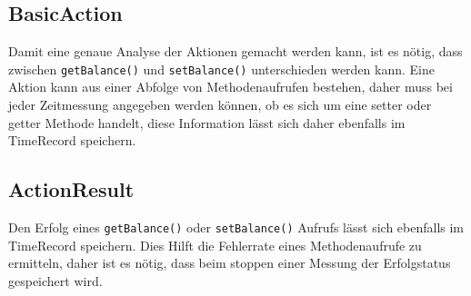 \subsection{BasicAction}
\label{sec:BasicAction}
Damit eine genaue Analyse der Aktionen ge\-macht werden kann, ist es nö\-tig, dass zwi\-schen \verb+getBalance()+ und \verb+setBalance()+ un\-ter\-schieden wer\-den kann. Eine Aktion kann aus einer Abfolge von Methoden\-auf\-rufen bestehen, daher muss bei jeder Zeitmessung angegeben werden können, ob es sich um eine setter oder getter Methode handelt, diese Information lässt sich daher ebenfalls im TimeRecord speichern.

\subsection{ActionResult}
\label{sec:ActionResult}
Den Erfolg eines \verb+getBalance()+ oder \verb+setBalance()+ Aufrufs lässt sich ebenfalls im TimeRecord speichern. Dies Hilft die Fehlerrate eines Methodenaufrufe zu ermitteln, daher ist es nötig, dass beim stoppen einer Messung der Erfolgstatus gespeichert wird.




